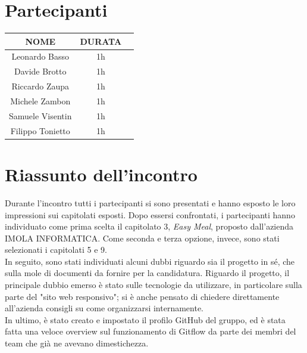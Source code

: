 \documentclass[12pt, oneside]{article}
\begin{document}
\section{Partecipanti}

\begin{center}
	\begin{tabular}{ | c | c | c | }
		\hline
		NOME & DURATA \\ 
		\hline
		Leonardo Basso & 1h \\  
		\hline 
		Davide Brotto & 1h \\   
        \hline
        Riccardo Zaupa & 1h \\   
		\hline
        Michele Zambon & 1h \\   
        \hline
        Samuele Visentin & 1h \\
        \hline
        Filippo Tonietto & 1h \\
        \hline
	\end{tabular}
\end{center}

\section{Riassunto dell'incontro}
Durante l'incontro tutti i partecipanti si sono presentati e hanno esposto le loro impressioni sui capitolati esposti. Dopo essersi confrontati, i partecipanti hanno individuato come prima scelta il capitolato 3, \textit{Easy Meal}, proposto dall'azienda IMOLA INFORMATICA. Come seconda e terza opzione, invece, sono stati selezionati i capitolati 5 e 9. \\
In seguito, sono stati individuati alcuni dubbi riguardo sia il progetto in sé, che sulla mole di documenti da fornire per la candidatura. Riguardo il progetto, il principale dubbio emerso è stato sulle tecnologie da utilizzare, in particolare sulla parte del "sito web responsivo"; si è anche pensato di chiedere direttamente all'azienda consigli su come organizzarsi internamente. \\
In ultimo, è stato creato e impostato il profilo GitHub del gruppo, ed è stata fatta una veloce overview sul funzionamento di Gitflow da parte dei membri del team che già ne avevano dimestichezza.
\end{document}
